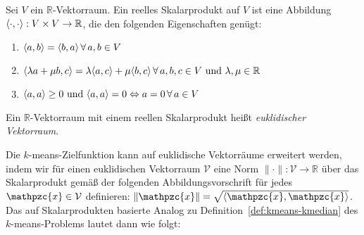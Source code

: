\begin{definition}
\label{def:innerproductspace}
	Sei $V$ ein $\mathbb{R}$-Vektorraum. Ein reelles Skalarprodukt auf $V$ ist eine Abbildung
	$\langle \cdot, \cdot \rangle : V \times V \rightarrow \mathbb{R}$, die den folgenden Eigenschaften genügt:
	\begin{enumerate}
		\item 	$\langle a, b \rangle = \langle b, a \rangle \, \forall \, a, b \in V$
		\item 	$\langle \lambda a + \mu b, c \rangle = \lambda \langle a, c \rangle + \mu \langle b, c \rangle \,
				\forall \, a,b,c \in V \textrm{ und } \lambda, \mu \in \mathbb{R}$
		\item 	$\langle a, a \rangle \geq 0 \textrm{ und } \langle a, a \rangle = 0 \Leftrightarrow a = 0 \, \forall \, a \in V$
	\end{enumerate}
	Ein $\mathbb{R}$-Vektorraum mit einem reellen Skalarprodukt heißt \emph{euklidischer Vektorraum}.
\end{definition}
Die $k$-means-Zielfunktion kann auf euklidische Vektorräume erweitert werden, indem wir für einen euklidischen Vektorraum
$\mathcal{V}$ eine Norm $\lVert \cdot \rVert : \mathcal{V} \rightarrow \mathbb{R}$ über das Skalarprodukt gemäß der folgenden
Abbildungsvorschrift für jedes $\mathpzc{x} \in \mathcal{V}$ definieren:
$\lVert \mathpzc{x} \rVert = \sqrt{\innerproduct{\mathpzc{x}}{\mathpzc{x}}}$.
Das auf Skalarprodukten basierte Analog zu Definition~\ref{def:kmeans-kmedian} des $k$-means-Problems lautet dann wie folgt:

